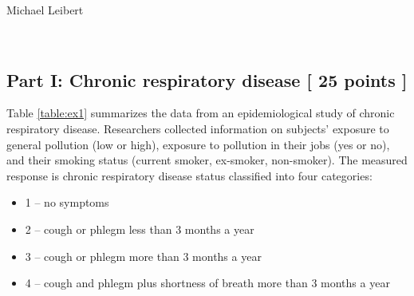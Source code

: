 \documentclass[]{article}
\title{}
\author{}
\date{}
\begin{document}
Michael Leibert

~

\subsection*{Part I:  Chronic respiratory disease [ 25 points ] }

Table \ref{table:ex1} summarizes the data from an epidemiological study
of chronic respiratory disease. Researchers collected information on
subjects' exposure to general pollution (low or high), exposure to
pollution in their jobs (yes or no), and their smoking status (current
smoker, ex-smoker, non-smoker). The measured response is chronic
respiratory disease status classified into four categories:

\begin{itemize}
\item 1 -- no symptoms \  
\item 2 -- cough or phlegm less than 3 months a year \ 
\item 3 -- cough or phlegm more than 3 months a year \
\item 4 -- cough and phlegm plus shortness of breath more than 3 months a year \ 
\end{itemize}
\end{document}
